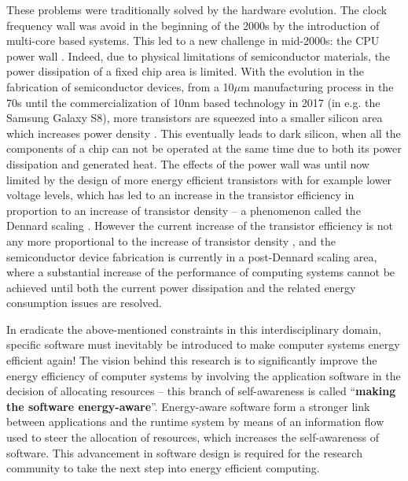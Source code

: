 \documentclass{article}
\begin{document}
These problems were traditionally solved by the hardware evolution.
The clock frequency wall was avoid in the beginning of the 2000s by the introduction of multi-core based systems. 
This led to a new challenge in mid-2000s: the CPU power wall \cite{Danowitz:12,Wang:13}. 
Indeed, due to physical limitations of semiconductor materials, the power dissipation of a fixed chip area is limited. 
With the evolution in the fabrication of semiconductor devices, from a 10$\mu$m manufacturing process in the 70s until the commercialization of 10nm based technology in 2017 (in e.g. the Samsung Galaxy S8), more transistors are squeezed into a smaller silicon area which increases power density \cite{5514312}. 
This eventually leads to dark silicon, when all the components of a chip can not be operated at the same time due to both its power dissipation and generated heat. 
The effects of the power wall was until now limited by the design of more energy efficient transistors with for example lower voltage levels,
which has led to an increase in the transistor efficiency in proportion to an increase of transistor density -- a phenomenon called the Dennard scaling \cite{Dennard:74}. 
However the current increase of the transistor efficiency is not any more proportional to the increase of transistor density \cite{Wang:13}, 
and the semiconductor device fabrication is currently in a post-Dennard scaling area, where a substantial increase of the performance of computing
systems cannot be achieved until both the current power dissipation and the related energy consumption issues are resolved.\smallskip

In eradicate the above-mentioned constraints in this interdisciplinary domain, specific software must inevitably be introduced to make computer systems energy efficient again!
The vision behind this research is to significantly improve the energy efficiency of computer systems by involving the application software in the decision of allocating resources -- this branch of self-awareness is called ``\textbf{making the software energy-aware}''.
Energy-aware software form a stronger link between applications and the runtime system by means of an information flow used to steer the allocation of resources,
which increases the self-awareness of software. This advancement in software design is required for the research community to take the next step into energy efficient computing.\smallskip
\end{document}
